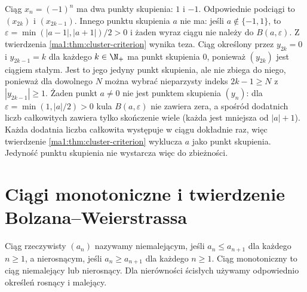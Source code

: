 \begin{przyklad}
Ciąg $x_n=(-1)^n$ ma dwa punkty skupienia: $1$ i $-1$. Odpowiednie podciągi to $(x_{2k})$ i $(x_{2k-1})$. Innego punktu skupienia $a$ nie ma: jeśli $a\notin\{-1,1\}$, to $\varepsilon=\min(|a-1|,|a+1|)/2>0$ i żaden wyraz ciągu nie należy do $B(a,\varepsilon)$. Z twierdzenia \ref{ma1:thm:cluster-criterion} wynika teza. Ciąg określony przez $y_{2k}=0$ i $y_{2k-1}=k$ dla każdego $k\in\N_+$ ma punkt skupienia $0$, ponieważ $(y_{2k})$ jest ciągiem stałym. Jest to jego jedyny punkt skupienia, ale nie zbiega do niego, ponieważ dla dowolnego $N$ można wybrać nieparzysty indeks $2k-1\ge N$ z $|y_{2k-1}|\ge1$. Żaden punkt $a\ne0$ nie jest punktem skupienia $(y_n)$: dla $\varepsilon=\min(1,|a|/2)>0$ kula $B(a,\varepsilon)$ nie zawiera zera, a spośród dodatnich liczb całkowitych zawiera tylko skończenie wiele (każda jest mniejsza od $|a|+1$). Każda dodatnia liczba całkowita występuje w ciągu dokładnie raz, więc twierdzenie \ref{ma1:thm:cluster-criterion} wyklucza $a$ jako punkt skupienia. Jedyność punktu skupienia nie wystarcza więc do zbieżności.
\end{przyklad}

\section{Ciągi monotoniczne i twierdzenie Bolzana--Weierstrassa}
\begin{definicja}
\label{ma1:def:monotone-sequence}
Ciąg rzeczywisty $(a_n)$ nazywamy niemalejącym, jeśli $a_n\le a_{n+1}$ dla każdego $n\ge1$, a nierosnącym, jeśli $a_n\ge a_{n+1}$ dla każdego $n\ge1$. Ciąg monotoniczny to ciąg niemalejący lub nierosnący. Dla nierówności ścisłych używamy odpowiednio określeń rosnący i malejący.
\end{definicja}


